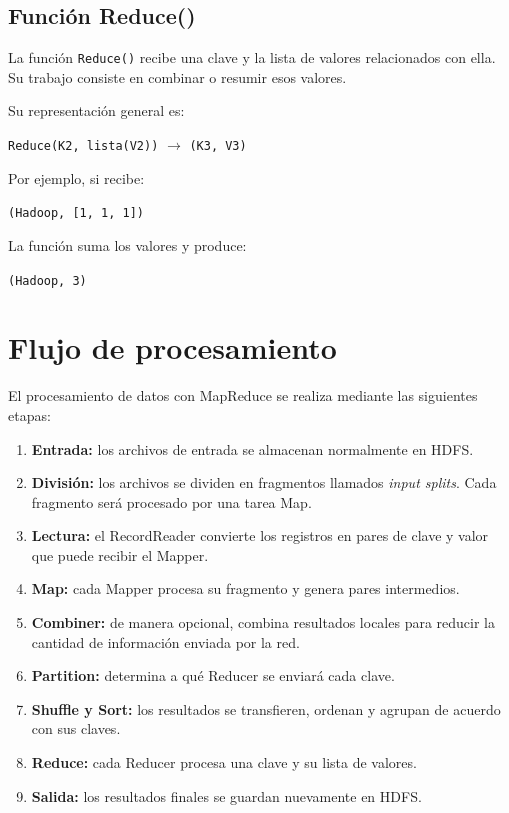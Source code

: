 \subsection*{Función Reduce()}

La función \texttt{Reduce()} recibe una clave y la lista de valores
relacionados con ella. Su trabajo consiste en combinar o resumir esos valores.

Su representación general es:

\begin{center}
\texttt{Reduce(K2, lista(V2))} $\longrightarrow$ \texttt{(K3, V3)}
\end{center}

Por ejemplo, si recibe:

\begin{center}
\texttt{(Hadoop, [1, 1, 1])}
\end{center}

La función suma los valores y produce:

\begin{center}
\texttt{(Hadoop, 3)}
\end{center}

\section{Flujo de procesamiento}

El procesamiento de datos con MapReduce se realiza mediante las siguientes
etapas:

\begin{enumerate}
    \item \textbf{Entrada:} los archivos de entrada se almacenan normalmente
    en HDFS.

    \item \textbf{División:} los archivos se dividen en fragmentos llamados
    \textit{input splits}. Cada fragmento será procesado por una tarea Map.

    \item \textbf{Lectura:} el RecordReader convierte los registros en pares de
    clave y valor que puede recibir el Mapper.

    \item \textbf{Map:} cada Mapper procesa su fragmento y genera pares
    intermedios.

    \item \textbf{Combiner:} de manera opcional, combina resultados locales
    para reducir la cantidad de información enviada por la red.

    \item \textbf{Partition:} determina a qué Reducer se enviará cada clave.

    \item \textbf{Shuffle y Sort:} los resultados se transfieren, ordenan y
    agrupan de acuerdo con sus claves.

    \item \textbf{Reduce:} cada Reducer procesa una clave y su lista de valores.

    \item \textbf{Salida:} los resultados finales se guardan nuevamente en
    HDFS.
\end{enumerate}

